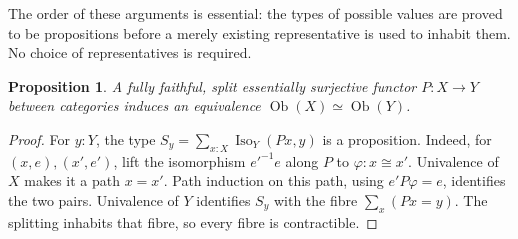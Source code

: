 \documentclass[11pt]{amsart}
\newtheorem{proposition}[theorem]{Proposition}
\theoremstyle{definition}
\theoremstyle{remark}
\newcommand{\Iso}{\operatorname{Iso}}
\newcommand{\Ob}{\operatorname{Ob}}
\begin{document}
The order of these arguments is essential: the types of possible values
are proved to be propositions before a merely existing representative
is used to inhabit them. No choice of representatives is required.

\begin{proposition}\label{prop:equivobjects}
A fully faithful, split essentially surjective functor $P:X\to Y$
between categories induces an equivalence $\Ob(X)\simeq\Ob(Y)$.
\end{proposition}
\begin{proof}
For $y:Y$, the type $S_y=\sum_{x:X}\Iso_Y(Px,y)$ is a proposition.
Indeed, for $(x,e),(x',e')$, lift the isomorphism $e'^{-1}e$ along $P$
to $\varphi:x\cong x'$. Univalence of $X$ makes it a path $x=x'$.
Path induction on this path, using $e'P\varphi=e$, identifies the two
pairs. Univalence of $Y$ identifies $S_y$ with the fibre
$\sum_x(Px=y)$. The splitting inhabits that fibre, so every fibre is
contractible.
\end{proof}
\end{document}

